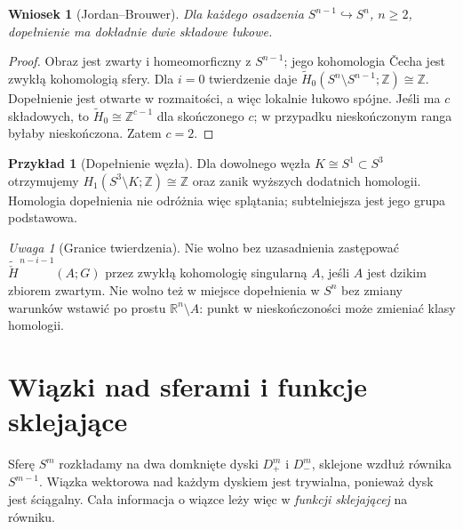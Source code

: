 \documentclass[11pt,a4paper,oneside]{report}
\newcommand{\R}{\mathbb{R}}
\newcommand{\Z}{\mathbb{Z}}
\theoremstyle{plain}
\newtheorem{wniosek}[twierdzenie]{Wniosek}
\theoremstyle{definition}
\newtheorem{przyklad}[twierdzenie]{Przykład}
\theoremstyle{remark}
\newtheorem{uwaga}[twierdzenie]{Uwaga}
\begin{document}
\begin{wniosek}[Jordan--Brouwer]
Dla każdego osadzenia $S^{n-1}\hookrightarrow S^n$, $n\ge2$,
dopełnienie ma dokładnie dwie składowe łukowe.
\end{wniosek}
\begin{proof}
Obraz jest zwarty i homeomorficzny z $S^{n-1}$;
jego kohomologia \v{C}echa jest zwykłą kohomologią sfery.
Dla $i=0$ twierdzenie daje
$\widetilde H_0(S^n\setminus S^{n-1};\Z)\cong\Z$.
Dopełnienie jest otwarte w rozmaitości, a więc lokalnie
łukowo spójne. Jeśli ma $c$ składowych, to
$\widetilde H_0\cong\Z^{c-1}$ dla skończonego $c$;
w przypadku nieskończonym ranga byłaby nieskończona.
Zatem $c=2$.
\end{proof}

\begin{przyklad}[Dopełnienie węzła]
Dla dowolnego węzła $K\cong S^1\subset S^3$ otrzymujemy
$H_1(S^3\setminus K;\Z)\cong\Z$ oraz zanik wyższych
dodatnich homologii. Homologia dopełnienia nie odróżnia
więc splątania; subtelniejsza jest jego grupa podstawowa.
\end{przyklad}

\begin{uwaga}[Granice twierdzenia]
Nie wolno bez uzasadnienia zastępować
$\widetilde{\check H}^{\,n-i-1}(A;G)$ przez zwykłą
kohomologię singularną $A$, jeśli $A$ jest dzikim zbiorem
zwartym. Nie wolno też w miejsce dopełnienia w $S^n$
bez zmiany warunków wstawić po prostu $\R^n\setminus A$:
punkt w nieskończoności może zmieniać klasy homologii.
\end{uwaga}

\section{Wiązki nad sferami i funkcje sklejające}
\label{sec:clutching-16}

Sferę $S^m$ rozkładamy na dwa
domknięte dyski $D^m_+$ i $D^m_-$,
sklejone wzdłuż równika
$S^{m-1}$. Wiązka wektorowa
nad każdym dyskiem jest
trywialna, ponieważ dysk
jest ściągalny. Cała informacja
o wiązce leży więc w
\emph{funkcji sklejającej}
na równiku.
\end{document}
